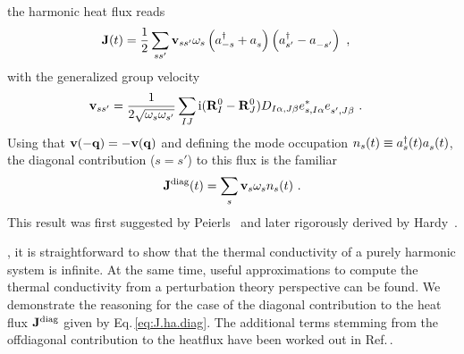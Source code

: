 the harmonic heat flux reads
\begin{align}
    \b J (t) 
	    &= \halb \sum_{ss'} \b v_{ss'} \omega_{s} \left( \D a_{-s} + \fD a_{s}  \right) \left( \D a_{s'} - \fD a_{-s'}  \right)~,
	  \label{eq:J.ha}
\end{align}
with the generalized group velocity
\begin{align}
	\b v_{ss'}
		&= \frac{1}{2 \sqrt{\omega_s \omega_{s'}}} \sum_{IJ} \im (\b R^0_I - \b R^0_J) D_{I \alpha, J \beta} e^\ast_{s, I \alpha} \fD e_{s', J \beta}~.
\end{align}
Using that ${\bf v} (- {\bf q}) = - {\bf v} ({\bf q})$ and defining the mode occupation $n_s (t) \equiv \D a_s (t) \fD a_s (t)$, the diagonal contribution ($s=s'$) to this flux is the familiar
\begin{align}
	\b J^{\rm diag} (t) 
		= \sum_{s} \b v_{s} \omega_{s} n_s (t)~.
	\label{eq:J.ha.diag}
\end{align}
This result was first suggested by Peierls~ and later rigorously derived by Hardy~\cite{Hardy1963}.

, it is straightforward to show that the thermal conductivity of a purely harmonic system is infinite. At the same time, useful approximations to compute the thermal conductivity from a perturbation theory perspective can be found. We demonstrate the reasoning for the case of the diagonal contribution to the heat flux ${\bf J}^{\rm diag}$ given by Eq.\,\eqref{eq:J.ha.diag}. The additional terms stemming from the offdiagonal contribution to the heatflux have been worked out in Ref.\,\cite{Isaeva2019}.

